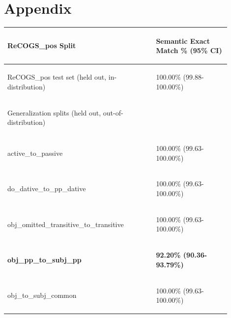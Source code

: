 \documentclass[11pt]{article}
\begin{document}
\section{Appendix}
\twocolumn
\begin{table}
\centering
\begin{tabular}{p{0.6\linewidth} p{0.3\linewidth}}
\hline
\begin{tiny}\textbf{ReCOGS\_pos Split}\end{tiny} & \begin{tiny}\textbf{Semantic Exact Match \% (95\% CI)}\end{tiny} \\
\hline
\begin{tiny}ReCOGS\_pos test set (held out, in-distribution)\end{tiny} & \begin{tiny} 100.00\% (99.88-100.00\%)\end{tiny} \\
\hline
\begin{tiny}Generalization splits (held out, out-of-distribution)\end{tiny} & \\
\hline
\begin{tiny}active\_to\_passive\end{tiny} & \begin{tiny}100.00\% (99.63-100.00\%)\end{tiny} \\
\begin{tiny}do\_dative\_to\_pp\_dative\end{tiny} & \begin{tiny} 100.00\% (99.63-100.00\%)\end{tiny} \\
\begin{tiny}obj\_omitted\_transitive\_to\_transitive\end{tiny} & \begin{tiny} 100.00\% (99.63-100.00\%)\end{tiny} \\
\begin{tiny}\textbf{obj\_pp\_to\_subj\_pp}\end{tiny} & \begin{tiny} \textbf{92.20\% (90.36- 93.79\%)}\end{tiny} \\
\begin{tiny}obj\_to\_subj\_common\end{tiny} & \begin{tiny} 100.00\% (99.63-100.00\%)\end{tiny} \\

\end{tabular}
\end{table}
\end{document}
